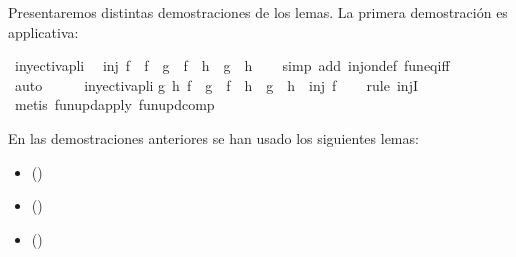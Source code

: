\begin{isabellebody}
\begin{isamarkuptext}
  Presentaremos distintas demostraciones de los lemas. La primera
  demostración es applicativa:%
\end{isamarkuptext}\isamarkuptrue%
\isamarkupfalse%
\ inyectivapli{\isacharcolon}\isanewline
\ \ {\isachardoublequoteopen}inj\ f\ {\isasymLongrightarrow}\ {\isacharparenleft}f\ {\isasymcirc}\ g\ {\isacharequal}\ f\ {\isasymcirc}\ h{\isacharparenright}\ {\isacharequal}\ {\isacharparenleft}g\ {\isacharequal}\ h{\isacharparenright}{\isachardoublequoteclose}\isanewline
%
\isadelimproof
\ \ %
\endisadelimproof
%
\isatagproof
{}\isamarkupfalse%
\ {\isacharparenleft}simp\ add{\isacharcolon}\ inj{\isacharunderscore}on{\isacharunderscore}def\ fun{\isacharunderscore}eq{\isacharunderscore}iff{\isacharparenright}\ \isanewline
\ \ \isamarkupfalse%
\ auto\isanewline
\ \ \isamarkupfalse%
%
\endisatagproof
{\isafoldproof}%
%
\isadelimproof
\ \isanewline
%
\endisadelimproof
\isanewline
{}\isamarkupfalse%
\ inyectivapli{}{\isacharcolon}\isanewline
{\isachardoublequoteopen}{\isasymforall}g\ h{\isachardot}\ {\isacharparenleft}f\ {\isasymcirc}\ g\ {\isacharequal}\ f\ {\isasymcirc}\ h\ {\isasymlongrightarrow}\ g\ {\isacharequal}\ h{\isacharparenright}\ {\isasymLongrightarrow}\ inj\ f{\isachardoublequoteclose}\isanewline
%
\isadelimproof
\ \ %
\endisadelimproof
%
\isatagproof
{}\isamarkupfalse%
\ {\isacharparenleft}rule\ injI{\isacharparenright}\isanewline
\ \ \isamarkupfalse%
\ {\isacharparenleft}metis\ fun{\isacharunderscore}upd{\isacharunderscore}apply\ fun{\isacharunderscore}upd{\isacharunderscore}comp{\isacharparenright}%
\endisatagproof
{\isafoldproof}%
%
\isadelimproof
%
\endisadelimproof
%
\begin{isamarkuptext}%
En las demostraciones anteriores se han usado los siguientes
 lemas:
  \begin{itemize}
    \item[]  
      \hfill ()
  \end{itemize} 
  \begin{itemize}
    \item[]  
      \hfill ()
  \end{itemize} 
  \begin{itemize}
    \item[]  
      \hfill ()
  \end{itemize} 


\end{isamarkuptext}
\end{isabellebody}
